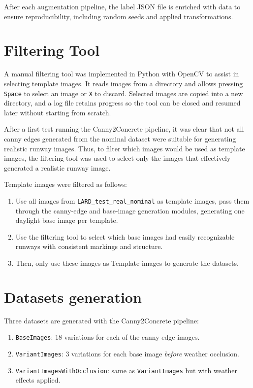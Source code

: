 After each augmentation pipeline, the label JSON file is enriched with data to ensure reproducibility, including random seeds and applied transformations.

\section{Filtering Tool}

A manual filtering tool was implemented in Python with OpenCV to assist in selecting template images. 
It reads images from a directory and allows pressing \texttt{Space} to select an image or \texttt{X} to discard. 
Selected images are copied into a new directory, and a log file retains progress so the tool can be closed and resumed later without starting from scratch.

After a first test running the Canny2Concrete pipeline, it was clear that not
all canny edges generated from the nominal dataset were suitable for generating
realistic runway images. Thus, to filter which images would be used as template
images, the filtering tool was used to select only the images that effectively
generated a realistic runway image.

Template images were filtered as follows:
\begin{enumerate}
\item Use all images from \texttt{LARD\_test\_real\_nominal} as template images, pass them through the canny-edge and base-image generation modules, generating one daylight base image per template.
\item Use the filtering tool to select which base images had easily recognizable runways with consistent markings and structure.
\item Then, only use these images as Template images to generate the datasets.
\end{enumerate}

\section{Datasets generation}

Three datasets are generated with the Canny2Concrete pipeline:

\begin{enumerate}
\item \texttt{BaseImages}: 18 variations for each of the canny edge images.
\item \texttt{VariantImages}: 3 variations for each base image \emph{before} weather occlusion.
\item \texttt{VariantImagesWithOcclusion}: same as \texttt{VariantImages} but with weather effects applied.
\end{enumerate}

